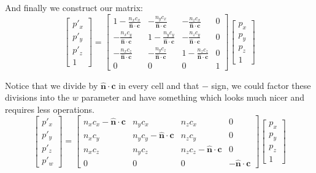 \documentclass[]{report}   %
\begin{document}
And finally we construct our matrix:
\[
	\begin{bmatrix}
	p\prime_x \\
	p\prime_y \\
	p\prime_z \\
	1
	\end{bmatrix}
	=	
	\begin{bmatrix}
			1 - \frac{n_x c_x}{\mathbf{\hat{n}}\cdot\mathbf{c}}	
		&	- \frac{n_y c_x}{\mathbf{\hat{n}}\cdot\mathbf{c}}	
		&	- \frac{n_z c_x}{\mathbf{\hat{n}}\cdot\mathbf{c}}
		&	0
		\\
			- \frac{n_x c_y}{\mathbf{\hat{n}}\cdot\mathbf{c}}
		&	1 - \frac{n_y c_y}{\mathbf{\hat{n}}\cdot\mathbf{c}}
		&	- \frac{n_z c_y}{\mathbf{\hat{n}}\cdot\mathbf{c}}
		&	0
		\\
			- \frac{n_x c_z}{\mathbf{\hat{n}}\cdot\mathbf{c}}
		&	- \frac{n_y c_z}{\mathbf{\hat{n}}\cdot\mathbf{c}}
		&	1 - \frac{n_z c_z}{\mathbf{\hat{n}}\cdot\mathbf{c}}
		&	0
		\\
		0 & 0 & 0 & 1
	\end{bmatrix}
	\begin{bmatrix}
		p_x \\
		p_y \\
		p_z \\
		1
	\end{bmatrix}
\]

Notice that we divide by \(\mathbf{\hat{n}}\cdot\mathbf{c}\) in every cell and that \(-\) sign, we could factor these divisions into the \(w\) parameter and have something which looks much nicer and requires less operations.
\[
	\begin{bmatrix}
	p\prime_x \\
	p\prime_y \\
	p\prime_z \\
	p\prime_w
	\end{bmatrix}
	=	
	\begin{bmatrix}
			n_x c_x - \mathbf{\hat{n}}\cdot\mathbf{c}	
		&	n_y c_x
		&	n_z c_x
		&	0
		\\
			n_x c_y
		&	n_y c_y - \mathbf{\hat{n}}\cdot\mathbf{c}
		&	n_z c_y
		&	0
		\\
			n_x c_z
		&	n_y c_z
		&	n_z c_z - \mathbf{\hat{n}}\cdot\mathbf{c}
		&	0
		\\
		0 & 0 & 0 & -\mathbf{\hat{n}}\cdot\mathbf{c}
	\end{bmatrix}
	\begin{bmatrix}
		p_x \\
		p_y \\
		p_z \\
		1
	\end{bmatrix}
\]
\end{document}
